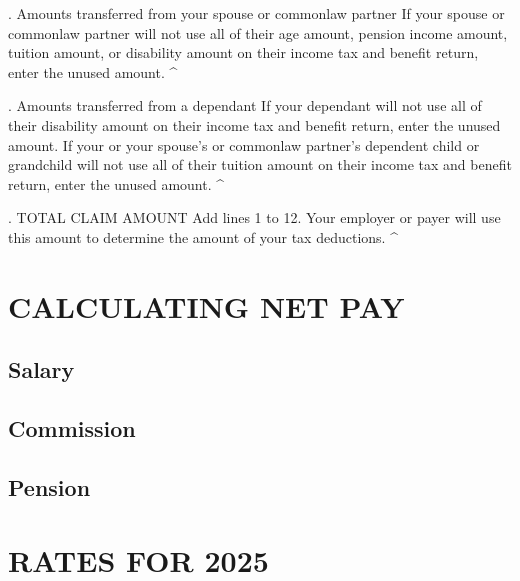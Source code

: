 \documentclass[letterpaper,10pt,english]{sphinxmanual}
\begin{document}
. Amounts transferred from your spouse or common\sphinxhyphen{}law partner \sphinxhyphen{} If your
spouse or common\sphinxhyphen{}law partner will not use all of their age amount, pension
income amount, tuition amount, or disability amount on their income tax and
benefit return, enter the unused amount. \textasciicircum{}

. Amounts transferred from a dependant \sphinxhyphen{} If your dependant will not use all
of their disability amount on their income tax and benefit return, enter the
unused amount. If your or your spouse’s or common\sphinxhyphen{}law partner’s dependent
child or grandchild will not use all of their tuition amount on their income
tax and benefit return, enter the unused amount. \textasciicircum{}

. TOTAL CLAIM AMOUNT \sphinxhyphen{} Add lines 1 to 12. Your employer or payer will use
this amount to determine the amount of your tax deductions. \textasciicircum{}

\sphinxstepscope


\chapter{CALCULATING NET PAY}
\label{\detokenize{calculating-net-pay:calculating-net-pay}}\label{\detokenize{calculating-net-pay::doc}}

\section{Salary}
\label{\detokenize{calculating-net-pay:salary}}

\section{Commission}
\label{\detokenize{calculating-net-pay:commission}}

\section{Pension}
\label{\detokenize{calculating-net-pay:pension}}
\sphinxstepscope


\chapter{RATES FOR 2025}
\label{\detokenize{rates_2025:rates-for-2025}}\label{\detokenize{rates_2025::doc}}
\end{document}
